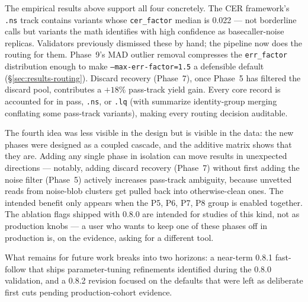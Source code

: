 \documentclass[11pt]{article}
\begin{document}
The empirical results above support all four concretely. The CER
framework's \texttt{.ns} track contains variants whose \texttt{cer\_factor}
median is 0.022 --- not borderline calls but variants the math identifies
with high confidence as basecaller-noise replicas. Validators previously
dismissed these by hand; the pipeline now does the routing for them.
Phase~9's MAD outlier removal compresses the \texttt{err\_factor}
distribution enough to make \texttt{--max-err-factor=1.5} a defensible
default (§\ref{sec:results-routing}). Discard recovery
(Phase~7), once Phase~5 has filtered the discard pool, contributes a
$+18\%$ pass-track yield gain. Every core record is accounted for in
pass, \texttt{.ns}, or \texttt{.lq} (with summarize identity-group
merging conflating some pass-track variants), making every routing
decision auditable.

The fourth idea was less visible in the design but is visible in the
data: the new phases were designed as a coupled cascade, and the
additive matrix shows that they are. Adding any single phase in isolation can move
results in unexpected directions ---
notably, adding discard recovery (Phase~7) without first adding the
noise filter (Phase~5) actively increases pass-track ambiguity, because
unvetted reads from noise-blob clusters get pulled back into otherwise-clean
ones. The intended benefit only appears when the {P5, P6, P7, P8} group
is enabled together. The ablation flags shipped with 0.8.0 are intended
for studies of this kind, not as production knobs --- a user who wants
to keep one of these phases off in production is, on the evidence, asking
for a different tool.

What remains for future work breaks into two horizons: a near-term
0.8.1 fast-follow that ships parameter-tuning refinements identified
during the 0.8.0 validation, and a 0.8.2 revision focused on the
defaults that were left as deliberate first cuts pending
production-cohort evidence.
\end{document}
